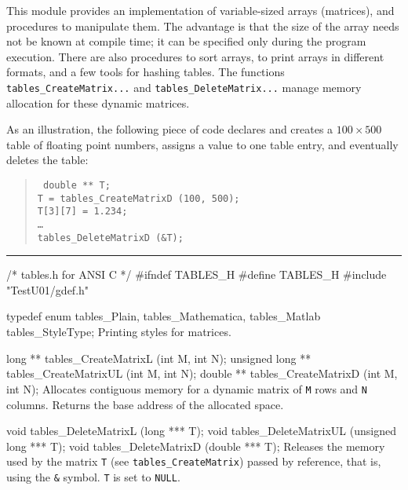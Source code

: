 
This module provides an implementation of variable-sized arrays (matrices),
and procedures to manipulate them.
The advantage is that the size of the array needs not be known
at compile time; it can be specified only during the program execution.
There are also procedures to sort arrays,  to
print  arrays in different formats,
and a few tools for hashing tables.
The functions {\tt tables\_CreateMatrix...} and
{\tt tables\_DeleteMatrix...} manage memory allocation for
these dynamic matrices.

As an illustration, the following piece of code declares and creates
a $100\times 500$ table of floating point numbers, assigns a value
to one table entry, and eventually deletes the table:
  \begin{verse}{\tt
    double ** T;\\
    T = tables\_CreateMatrixD (100, 500);\\
    T[3][7] = 1.234;\\
    \dots \\
    tables\_DeleteMatrixD (\&T);
  }\end{verse}

\bigskip\hrule
\code\hide
/* tables.h for ANSI C */
#ifndef TABLES_H
#define TABLES_H
\endhide
#include "TestU01/gdef.h"
\endcode

\code

typedef enum {
   tables_Plain,
   tables_Mathematica,
   tables_Matlab
   } tables_StyleType;
\endcode
  \tab Printing styles for matrices.
  \endtab

\code

long ** tables_CreateMatrixL  (int M, int N);
unsigned long ** tables_CreateMatrixUL (int M, int N);
double ** tables_CreateMatrixD  (int M, int N);
\endcode
  \tab Allocates contiguous memory for a dynamic 
  matrix of {\tt M} rows and {\tt N} columns. Returns the base
  address of the allocated space.
  \endtab
\code


void tables_DeleteMatrixL  (long *** T);
void tables_DeleteMatrixUL (unsigned long *** T);
void tables_DeleteMatrixD  (double *** T);
\endcode
  \tab Releases the memory used by the matrix {\tt T}
  (see {\tt tables\_CreateMatrix}) passed by
  reference, that is, using the {\tt \&} symbol. 
  {\tt T} is set to {\tt NULL}.
  \endtab
\code


